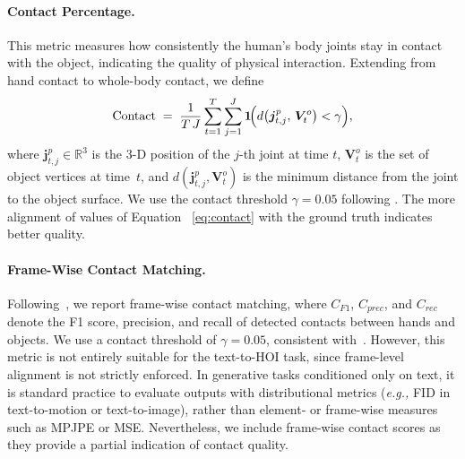 \paragraph{Contact Percentage.}  
This metric measures how consistently the human's body joints stay in contact with the object, indicating the quality of physical interaction.  
Extending \citet{li2023object} from hand contact to whole-body contact, we define
\begin{equation}
\text{Contact} \;=\; 
\frac{1}{T\,J}\sum_{t=1}^{T}\sum_{j=1}^{J}
  \mathbf{1}\!\Bigl(d\bigl(\boldsymbol{j}^{p}_{t,j},\,\boldsymbol{V}^{o}_{t}\bigr)<\gamma\Bigr),
\label{eq:contact}
\end{equation}
where $\boldsymbol{j}^{p}_{t,j}\!\in\!\mathbb{R}^{3}$ is the 3-D position of the $j$-th joint at time $t$, $\boldsymbol{V}^{o}_{t}$ is the set of object vertices at time~$t$, and
$d(\boldsymbol{j}^{p}_{t,j},\boldsymbol{V}^{o}_{t})$ is the minimum distance from the joint to the object surface.  
We use the contact threshold $\gamma = 0.05$ following \citet{li2023controllable}.  
The more alignment of values of Equation ~\eqref{eq:contact} with the ground truth indicates better quality.

\paragraph{Frame-Wise Contact Matching.}
Following~\citet{li2023object}, we report frame-wise contact matching, where $C_{F1}$, $C_{prec}$, and $C_{rec}$ denote the F1 score, precision, and recall of detected contacts between hands and objects. We use a contact threshold of $\gamma = 0.05$, consistent with~\citet{li2023controllable}. However, this metric is not entirely suitable for the text-to-HOI task, since frame-level alignment is not strictly enforced. In generative tasks conditioned only on text, it is standard practice to evaluate outputs with distributional metrics (\textit{e.g.,} FID in text-to-motion or text-to-image), rather than element- or frame-wise measures such as MPJPE or MSE. Nevertheless, we include frame-wise contact scores as they provide a partial indication of contact quality.

